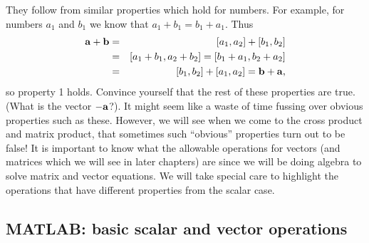 They follow from similar properties which hold for numbers. For
example, for numbers $a_1$ and $b_1$ we know that $a_1+b_1 =
b_1+a_1$. Thus
\begin{eqnarray*}
\aa + \bb & = & [a_1,a_2]+[b_1,b_2] \\
& = & [a_1+b_1,a_2+b_2] = [b_1+a_1,b_2+a_2] \\
& = & [b_1,b_2]+[a_1,a_2] = \bb+ \aa, \\
\end{eqnarray*}
so property 1 holds.  Convince yourself that the rest of these
properties are true. (What is the vector $-\aa$?). It might seem like
a waste of time fussing over obvious properties such as
these. However, we will see when we come to the cross product and
matrix product, that sometimes such ``obvious'' properties turn out to
be false! It is important to know what the allowable operations for vectors 
(and matrices which we will see in later chapters) are since we will be doing 
algebra to solve matrix and vector equations. We will take special care to 
highlight the operations that have different properties from the scalar case.  

\subsection{MATLAB: basic scalar and vector operations}


